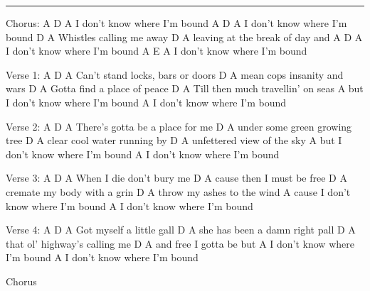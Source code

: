 \noindent\rule{\columnwidth}{1pt}

\begin{multicols}{2}
\begin{lstsong}
Chorus:
         A    D        A 
I don't know where I'm bound
            A    D        A 
I don't know where I'm bound
          D           A 
Whistles calling me away
        D                A 
leaving at the break of day and
          A   D        A 
I don't know where I'm bound
        A    E         A 
I don't know where I'm bound


Verse 1:
           A      D       A
Can't stand locks, bars or doors
          D            A
mean cops insanity and wars
      D               A
Gotta find a place of peace
     D                    A
Till then much travellin' on seas
            A
but I don't know where I'm bound
        A
I don't know where I'm bound


Verse 2:
         A         D         A
There's gotta be a place for me
                 D       A
under some green growing tree
           D             A
clear cool water running by
           D           A
unfettered view of the sky
      A
but I don't know where I'm bound
         A
I don't know where I'm bound
\end{lstsong}
\columnbreak
\begin{lstsong}
Verse 3:
       A         D    A
When I die don't bury me
             D       A
cause then I must be free
   D            A
cremate my body with a grin
         D            A
throw my ashes to the wind
              A
cause I don't know where I'm bound
        A
I don't know where I'm bound


Verse 4:
   A        D      A
Got myself a little gall
               D          A
she has been a damn right pall
         D                 A
that ol' highway's calling me
    D            A
and free I gotta be but
         A
I don't know where I'm bound
        A
I don't know where I'm bound

Chorus
\end{lstsong}
\end{multicols}
\newpage

